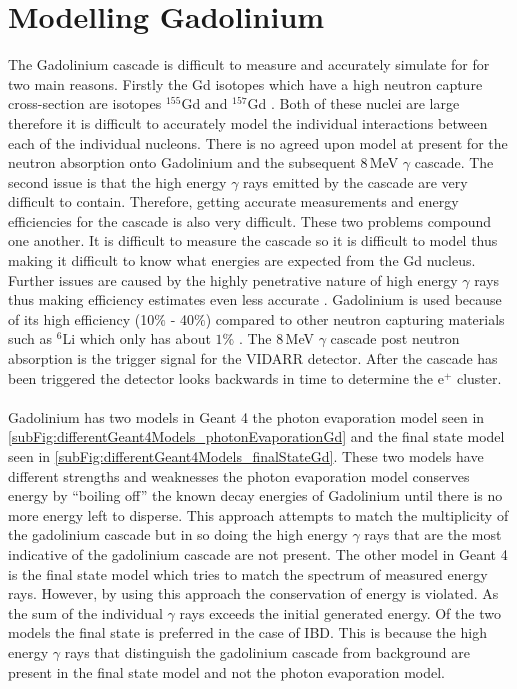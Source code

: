 \section{Modelling Gadolinium}\label{sec:geant4Simulation_modellingGadolinium}
The Gadolinium cascade is difficult to measure and accurately simulate for for two main reasons. Firstly the Gd isotopes which have a high neutron capture cross-section are isotopes $^155$Gd and $^157$Gd \cite{molnar_2004}. Both of these nuclei are large therefore it is difficult to accurately model the individual interactions between each of the individual nucleons. There is no agreed upon model at present for the neutron absorption onto Gadolinium and the subsequent 8\,MeV $\gamma$ cascade. The second issue is that the high energy $\gamma$ rays emitted by the cascade are very difficult to contain. Therefore, getting accurate measurements and energy efficiencies for the cascade is also very difficult. These two problems compound one another. It is difficult to measure the cascade so it is difficult to model thus making it difficult to know what energies are expected from the Gd nucleus. Further issues are caused by the highly penetrative nature of high energy $\gamma$ rays thus making efficiency estimates even less accurate \cite{molnar_2004}. Gadolinium is used because of its high efficiency (10$\%$ - 40$\%$) compared to other neutron capturing materials such as $^6$Li which only has about $1\%$ \cite{Abdushukurov_2010}. The 8\,MeV $\gamma$ cascade post neutron absorption is the trigger signal for the VIDARR detector. After the cascade has been triggered the detector looks backwards in time to determine the e$^+$ cluster.
\\\\Gadolinium has two models in Geant 4 the photon evaporation model seen in \ref{subFig:differentGeant4Models_photonEvaporationGd} and the final state model seen in  \ref{subFig:differentGeant4Models_finalStateGd}. These two models have different strengths and weaknesses the photon evaporation model conserves energy by ``boiling off'' the known decay energies of Gadolinium until there is no more energy left to disperse. This approach attempts to match the multiplicity of the gadolinium cascade but in so doing the high energy $\gamma$ rays that are the most indicative of the gadolinium cascade are not present. The other model in Geant 4 is the final state model which tries to match the spectrum of measured energy rays. However, by using this approach the conservation of energy is violated. As the sum of the individual $\gamma$ rays exceeds the initial generated energy. Of the two models the final state is preferred in the case of IBD. This is because the high energy $\gamma$ rays that distinguish the gadolinium cascade from background are present in the final state model and not the photon evaporation model.

